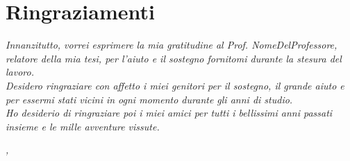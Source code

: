 
\cleardoublepage
{}
{}



\bigskip

\begingroup
\let\clearpage\relax
\let\cleardoublepage\relax
\let\cleardoublepage\relax

\chapter*{Ringraziamenti}

\noindent \textit{Innanzitutto, vorrei esprimere la mia gratitudine al Prof. NomeDelProfessore, relatore della mia tesi, per l'aiuto e il sostegno fornitomi durante la stesura del lavoro.}\\

\noindent \textit{Desidero ringraziare con affetto i miei genitori per il sostegno, il grande aiuto e per essermi stati vicini in ogni momento durante gli anni di studio.}\\

\noindent \textit{Ho desiderio di ringraziare poi i miei amici per tutti i bellissimi anni passati insieme e le mille avventure vissute.}\\
\bigskip

\noindent\textit{\myLocation, \myTime}
\hfill \myName

\endgroup

